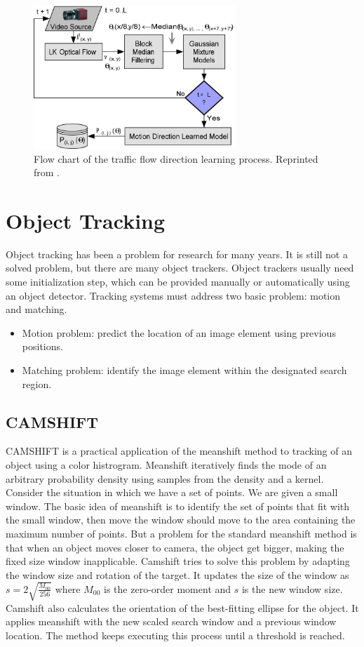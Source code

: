 \begin{figure}[h]
  \centering
  \includegraphics[width=3in]{figures/learning.jpg}  
  \caption[Learning flow chart]{Flow chart of the traffic flow direction learning process. Reprinted from  . }
  \label{fig:learning}
\end{figure}



\section{Object Tracking}
\label{Tracking}
Object tracking has been a problem for research for many years. It is still not a solved problem, but there are many object trackers. Object trackers usually need some initialization step, which can be provided manually or automatically using an object detector. Tracking systems must address two basic problem: motion and matching.
\begin{itemize}
	\item Motion problem: predict the location of an image element using previous positions.
	\item Matching problem: identify the image element within the designated search region.
\end{itemize}

\subsection{CAMSHIFT}
CAMSHIFT is a practical application of the meanshift method to tracking of an object using a color histrogram. Meanshift iteratively finds the mode of an arbitrary probability density using samples from the density and a kernel. Consider the situation in which we have a set of points. We are given a small window. The basic idea of meanshift is to identify the set of points that fit with the small window, then move the window should move to the area containing the maximum number of points. But a problem for the standard meanshift method is that when an object moves closer to camera, the object get bigger, making the fixed size window inapplicable. Camshift tries to solve this problem by adapting the window size and rotation of the target. It updates the size of the window as $ s = 2 \sqrt{\frac{M_{00}}{256}} $ where $M_{00}$ is the zero-order moment and $ s $ is the new window size. Camshift also calculates the orientation of the best-fitting ellipse for the object. It applies meanshift with the new scaled search window and a previous window location. The method keeps executing this process until a threshold is reached.

